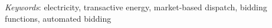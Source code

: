 \documentclass[12pt]{article}%
\begin{document}
\medskip
\vspace{0.5cm}
\noindent \textit{Keywords}: electricity, transactive energy, market-based dispatch, bidding functions, automated bidding




\clearpage

\doublespacing













\pagebreak

\singlespacing
\newpage


\clearpage
\end{document}
